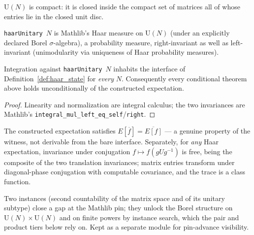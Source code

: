 \begin{theorem}[Compactness]\label{thm:compact_unitary}
\leanok
$\mathrm U(N)$ is compact: it is closed inside the compact set of
matrices all of whose entries lie in the closed unit disc.
\end{theorem}

\begin{definition}\label{def:haar_measure}
\leanok
{}
\texttt{haarUnitary}~$N$ is Mathlib's Haar measure on $\mathrm U(N)$
(under an explicitly declared Borel $\sigma$-algebra), a probability
measure, right-invariant as well as left-invariant (unimodularity via
uniqueness of Haar probability measures).
\end{definition}

\begin{theorem}[Inhabitation]\label{thm:haar_expectation}
\leanok
{}
Integration against \texttt{haarUnitary}~$N$ inhabits the interface of
Definition~\ref{def:haar_state} for \emph{every} $N$. Consequently
every conditional theorem above holds unconditionally of the
constructed expectation.
\end{theorem}
\begin{proof}
\leanok
{}
Linearity and normalization are integral calculus; the two
invariances are Mathlib's
\texttt{integral\_mul\_left\_eq\_self}/\texttt{right}.
\end{proof}

\begin{theorem}\label{thm:star_conj}
\leanok
{}
The constructed expectation satisfies
$E[\overline{f}]=\overline{E[f]}$ --- a genuine property of the
witness, not derivable from the bare interface. Separately, for
\emph{any} Haar expectation, invariance under conjugation
$f\mapsto f(gUg^{-1})$ is free, being the composite of the two
translation invariances; matrix entries transform under diagonal-phase
conjugation with computable covariance, and the trace is a class
function.
\end{theorem}

\begin{remark}\label{rem:shim}
\leanok
Two instances (second countability of the matrix space and of its
unitary subtype) close a gap at the Mathlib pin; they unlock the Borel
structure on $\mathrm U(N)\times\mathrm U(N)$ and on finite powers by
instance search, which the pair and product tiers below rely on. Kept
as a separate module for pin-advance visibility.
\end{remark}

